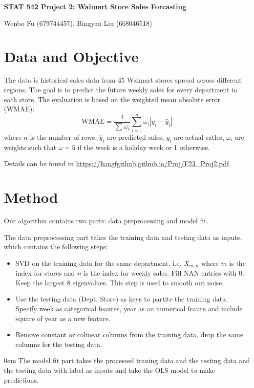 \documentclass[12pt]{article}
\theoremstyle{plain}
\renewcommand{\title}[1]{\vbox{\center\bf{\Large{#1}}}\vspace{5mm}}
\renewcommand{\author}[1]{\vbox{\center#1}\vspace{5mm}}
\renewcommand{\hat}{\widehat}
\begin{document}
\begin{center}
\title{STAT 542 Project 2: Walmart Store Sales Forcasting}

\author{Wenbo Fu (679744457), Bingyan Liu (668046518)}

\end{center}
  

\baselineskip=17.63pt 


\section{Data and Objective}

The data is historical sales data from 45 Walmart stores spread across different regions. The goal is to predict the future weekly sales for every department in each store. The evaluation is based on the weighted mean absolute error (WMAE):
\begin{equation}
\text{WMAE} = \frac{1}{\sum \omega_i}\sum_{i=1}^n \omega_i |y_i - \hat{y}_i|
\end{equation}
where $n$ is the number of rows, $\hat{y}_i$ are predicted sales, $y_i$ are actual satles, $\omega_i$ are weights such that $\omega=5$ if the week is a holiday week or 1 otherwise.

Details can be found in \url{https://liangfgithub.github.io/Proj/F23_Proj2.pdf}. 

\section{Method}
Our algorithm contains two parts: data preprocessing and model fit. 

The data preprocessing part takes the training data and testing data as inputs, which contains the following steps:
\begin{itemize}
\itemsep0em
\item SVD on the training data for the same department, i.e. $X_{m,n}$ where $m$ is the index for stores and $n$ is the index for weekly sales. Fill NAN entries with 0. Keep the largest 8 eigenvalues. This step is used to smooth out noise.
\item Use the testing data (Dept, Store) as keys to partite the training data. Specify week as categorical feaures, year as an numerical feaure and include square of year as a new feature.
\item Remove constant or colinear columns from the training data, drop the same columns for the testing data.
\end{itemize}
\itemsep0em
The model fit part takes the processed traning data and the testing data and the testing data with label as inputs and take the OLS model to make predictions.
\end{document}
